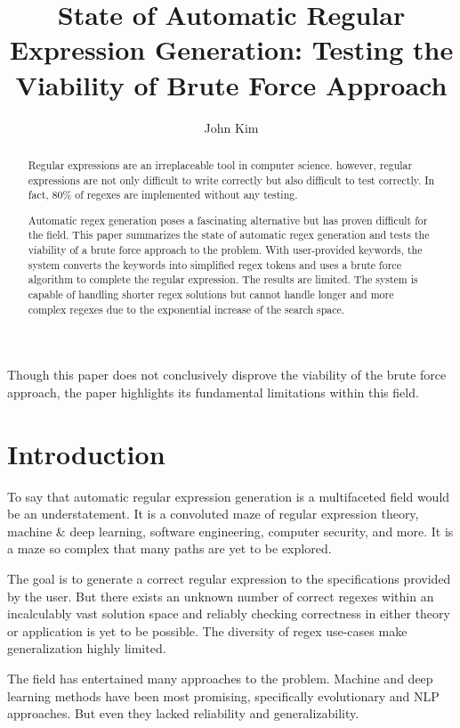 \documentclass[10pt,twocolumn]{article}
\title{State of Automatic Regular Expression Generation: Testing the Viability of Brute Force Approach}
\author{John Kim}
\affiliation{Occidental College}
\begin{document}
\maketitle

\begin{abstract}
Regular expressions are an irreplaceable tool in computer science. however, regular expressions are not only difficult to write correctly but also difficult to test correctly. In fact, 80\% of regexes are implemented without any testing\cite{Zheng2021}.

Automatic regex generation poses a fascinating alternative but has proven difficult for the field. This paper summarizes the state of automatic regex generation and tests the viability of a brute force approach to the problem. With user-provided keywords, the system converts the keywords into simplified regex tokens and uses a brute force algorithm to complete the regular expression. The results are limited. The system is capable of handling shorter regex solutions but cannot handle longer and more complex regexes due to the exponential increase of the search space.
\end{abstract}

Though this paper does not conclusively disprove the viability of the brute force approach, the paper highlights its fundamental limitations within this field. 

\section{Introduction}

To say that automatic regular expression generation is a multifaceted field would be an understatement. It is a convoluted maze of regular expression theory, machine \& deep learning, software engineering, computer security, and more. It is a maze so complex that many paths are yet to be explored. 

The goal is to generate a correct regular expression to the specifications provided by the user. But there exists an unknown number of correct regexes within an incalculably vast solution space and reliably checking correctness in either theory or application is yet to be possible. The diversity of regex use-cases make generalization highly limited.

The field has entertained many approaches to the problem. Machine and deep learning methods have been most promising, specifically evolutionary and NLP approaches. But even they lacked reliability and generalizability.
\end{document}
